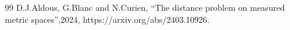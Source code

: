 \documentclass[10pt,a4paper]{amsart}
\theoremstyle{definition}\newtheorem{defi}[theo]{Definition}
\begin{document}
\begin{thebibliography}{99}
 D.J.Aldous, G.Blanc and N.Curien, ``The distance problem on measured metric spaces'',2024, https://arxiv.org/abs/2403.10926.
\end{thebibliography}
\end{document}
